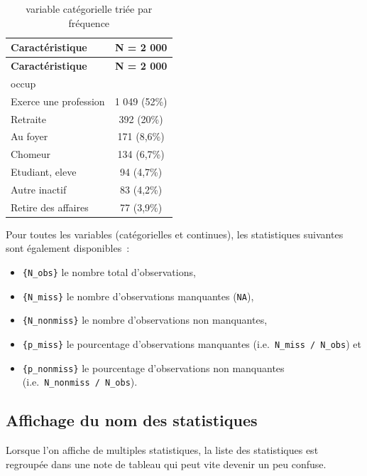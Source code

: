 \documentclass[
  letterpaper,
  DIV=11,
  numbers=noendperiod,
  oneside]{scrreprt}
\providecommand{\tightlist}{%
  \setlength{\itemsep}{0pt}\setlength{\parskip}{0pt}}\usepackage{longtable,booktabs,array}
\begin{document}
\hypertarget{tbl-stat-var-cat-sort}{}
\begin{longtable}[]{@{}lc@{}}
\caption{\label{tbl-stat-var-cat-sort}variable catégorielle triée par
fréquence}\tabularnewline
\toprule()
\textbf{Caractéristique} & \textbf{N = 2 000} \\
\midrule()
\endfirsthead
\toprule()
\textbf{Caractéristique} & \textbf{N = 2 000} \\
\midrule()
\endhead
occup & \\
Exerce une profession & 1 049 (52\%) \\
Retraite & 392 (20\%) \\
Au foyer & 171 (8,6\%) \\
Chomeur & 134 (6,7\%) \\
Etudiant, eleve & 94 (4,7\%) \\
Autre inactif & 83 (4,2\%) \\
Retire des affaires & 77 (3,9\%) \\
\bottomrule()
\end{longtable}

Pour toutes les variables (catégorielles et continues), les statistiques
suivantes sont également disponibles~:

\begin{itemize}
\tightlist
\item
  \texttt{\{N\_obs\}} le nombre total d'observations,
\item
  \texttt{\{N\_miss\}} le nombre d'observations manquantes
  (\texttt{NA}),
\item
  \texttt{\{N\_nonmiss\}} le nombre d'observations non manquantes,
\item
  \texttt{\{p\_miss\}} le pourcentage d'observations manquantes
  (i.e.~\texttt{N\_miss\ /\ N\_obs}) et
\item
  \texttt{\{p\_nonmiss\}} le pourcentage d'observations non manquantes
  (i.e.~\texttt{N\_nonmiss\ /\ N\_obs}).
\end{itemize}

\hypertarget{affichage-du-nom-des-statistiques}{%
\subsection{Affichage du nom des
statistiques}\label{affichage-du-nom-des-statistiques}}

Lorsque l'on affiche de multiples statistiques, la liste des
statistiques est regroupée dans une note de tableau qui peut vite
devenir un peu confuse.
\end{document}
